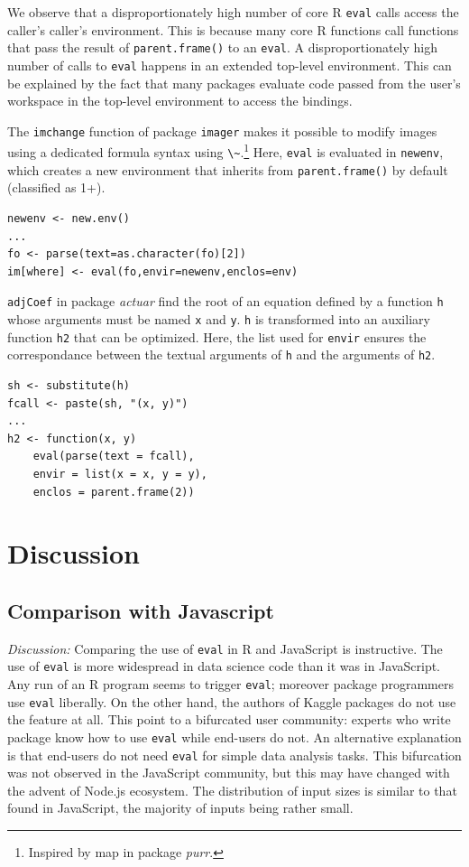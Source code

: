 \documentclass[USenglish,cleveref, autoref, thm-restate]{lipics-v2019}
\newcommand{\eval}{\texttt{eval}\xspace}
\renewcommand{\c}[1]{\lstinline{#1}\xspace}
\begin{document}
We observe that a disproportionately high number of core R \eval calls
access the caller's caller's environment. This is because many core R
functions call functions that pass the result of \c{parent.frame()} to an
\eval.  A disproportionately high number of calls to \eval happens in an
extended top-level environment. This can be explained by the fact that many
packages evaluate code passed from the user's workspace in the top-level
environment to access the bindings.


The \c{imchange} function of package \c{imager} makes it possible to modify
images using a dedicated formula syntax using \c{\~}.\footnote{Inspired by
 {map} in package \emph{purr}.}  Here, \eval is evaluated in \c{newenv},
which creates a new environment that inherits from \c{parent.frame()} by
default (classified as 1+).


\begin{lstlisting}
newenv <- new.env()
...
fo <- parse(text=as.character(fo)[2])
im[where] <- eval(fo,envir=newenv,enclos=env)
\end{lstlisting}

\c{adjCoef} in package \emph{actuar} find the root of an equation defined by
a function \c{h} whose arguments must be named \c{x} and \c{y}.  \c{h} is
transformed into an auxiliary function \c{h2} that can be optimized. Here,
the list used for \c{envir} ensures the correspondance between the textual
arguments of \c{h} and the arguments of \c{h2}.


\begin{lstlisting}
sh <- substitute(h)
fcall <- paste(sh, "(x, y)")
...
h2 <- function(x, y)
    eval(parse(text = fcall),
    envir = list(x = x, y = y),
    enclos = parent.frame(2))
\end{lstlisting}

\section{Discussion}

\subsection{Comparison with Javascript}

\medskip\noindent\emph{Discussion:} Comparing the use of \eval in R and
JavaScript is instructive. The use of \eval is more widespread in data
science code than it was in JavaScript. Any run of an R program seems to
trigger \eval; moreover package programmers use \eval liberally. On the
other hand, the authors of Kaggle packages do not use the feature at all.
This point to a bifurcated user community: experts who write package know
how to use \eval while end-users do not. An alternative explanation is that
end-users do not need \eval for simple data analysis tasks. This bifurcation
was not observed in the JavaScript community, but this may have changed with
the advent of Node.js ecosystem.  The distribution of input sizes is similar
to that found in JavaScript, the majority of inputs being rather small.
\end{document}
